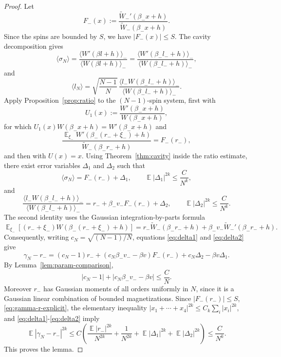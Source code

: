 \documentclass[10pt,a4paper]{amsart}
\DeclareMathOperator{\E}{\mathds{E}}
\providecommand{\Wtil}{\widetilde W}
\renewcommand{\le}{\leqslant}
\begin{document}
\begin{proof}
Let
\[
  F_-(x):=\frac{\Wtil_-'(\beta_-x+h)}{\Wtil_-(\beta_-x+h)}.
\]
Since the spins are bounded by $S$, we have $|F_-(x)|\le S$. The cavity decomposition gives
\[
  \langle\sigma_N\rangle
  =\frac{\langle W'(\beta l+h)\rangle_-}{\langle W(\beta l+h)\rangle_-}
  =\frac{\langle W'(\beta_- l_-+h)\rangle_-}{\langle W(\beta_- l_-+h)\rangle_-},
\]
and
\[
  \langle l_N\rangle
  =\sqrt{\frac{N-1}{N}}\,
  \frac{\langle l_-W(\beta_-l_-+h)\rangle_-}{\langle W(\beta_-l_-+h)\rangle_-}.
\]
Apply Proposition~\ref{prop:ratio} to the $(N-1)$-spin system, first with
\[
  U_1(x):=\frac{W'(\beta_-x+h)}{W(\beta_-x+h)},
\]
for which $U_1(x)W(\beta_-x+h)=W'(\beta_-x+h)$ and
\[
  \frac{\E_{\xi_-}W'(\beta_-(r_-+\xi_-)+h)}{\Wtil_-(\beta_-r_-+h)}
  =F_-(r_-),
\]
and then with $U(x)=x$. Using Theorem~\ref{thm:cavity} inside the ratio estimate, there exist error variables $\Delta_1$ and $\Delta_2$ such that
\begin{equation}\label{eq:delta1}
  \langle\sigma_N\rangle=F_-(r_-)+\Delta_1,
  \qquad
  \E|\Delta_1|^{2k}\le \frac{C}{N^k},
\end{equation}
and
\begin{equation}\label{eq:delta2}
  \frac{\langle l_-W(\beta_-l_-+h)\rangle_-}{\langle W(\beta_-l_-+h)\rangle_-}
  =r_-+\beta_-v_-F_-(r_-)+\Delta_2,
  \qquad
  \E|\Delta_2|^{2k}\le \frac{C}{N^k}.
\end{equation}
The second identity uses the Gaussian integration-by-parts formula
\[
  \E_{\xi_-}[(r_-+\xi_-)W(\beta_-(r_-+\xi_-)+h)]
  =r_-\Wtil_-(\beta_-r_-+h)+\beta_-v_-\Wtil_-'(\beta_-r_-+h).
\]
Consequently, writing $c_N=\sqrt{(N-1)/N}$, equations \eqref{eq:delta1} and \eqref{eq:delta2} give
\begin{equation}\label{eq:gamma-r-explicit}
  \gamma_N-r_-=(c_N-1)r_-+(c_N\beta_-v_- -\beta v)F_-(r_-)+c_N\Delta_2-\beta v\Delta_1.
\end{equation}
By Lemma~\ref{lem:param-comparison},
\[
  |c_N-1|+|c_N\beta_-v_- -\beta v|\le \frac{C}{N}.
\]
Moreover $r_-$ has Gaussian moments of all orders uniformly in $N$, since it is a Gaussian linear combination of bounded magnetizations. Since $|F_-(r_-)|\le S$, \eqref{eq:gamma-r-explicit}, the elementary inequality $|x_1+\cdots+x_4|^{2k}\le C_k\sum_i|x_i|^{2k}$, and \eqref{eq:delta1}-\eqref{eq:delta2} imply
\[
  \E|\gamma_N-r_-|^{2k}
  \le C\left(\frac{\E|r_-|^{2k}}{N^{2k}}+\frac1{N^{2k}}+\E|\Delta_1|^{2k}+\E|\Delta_2|^{2k}\right)
  \le \frac{C}{N^k}.
\]
This proves the lemma.
\end{proof}
\end{document}
